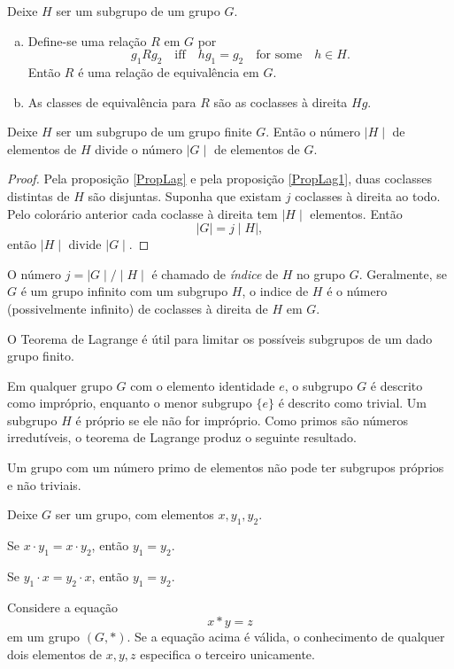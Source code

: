 \begin{stat}\label{PropLag}
  Deixe $H$ ser um subgrupo de um grupo $G$.
  \begin{enumerate}[a.]
    \item Define-se uma relação $R$ em $G$ por $$ g_{1} R g_{2}\quad \textrm{iff}\quad hg_{1} = g_{2}\quad \textrm{for\ some}\quad h\in H.$$ Então $R$ é uma relação de equivalência em $G$.
    \item As classes de equivalência para $R$ são as coclasses à direita $Hg$.
  \end{enumerate}
\end{stat}

\begin{theorem}
  Deixe $H$ ser um subgrupo de um grupo finite $G$. Então o número $\mid H\mid$ de elementos de $H$ divide o número $\mid G\mid$ de elementos de $G$.
  \begin{proof}
    Pela proposição \ref{PropLag} e pela proposição \ref{PropLag1}, duas coclasses distintas de $H$ são disjuntas. Suponha que existam $j$ coclasses à direita ao todo. Pelo colorário anterior cada coclasse à direita tem $\mid H \mid$ elementos. Então
    $$ \mid G\mid = j\mid H\mid,$$ então $\mid H \mid $ divide $\mid G \mid $.
  \end{proof}
\end{theorem}

O número $j = \mid G\mid / \mid H\mid$ é chamado de \emph{índice} de $H$ no grupo $G$. Geralmente, se $G$ é um grupo infinito com um subgrupo $H$, o indice de $H$ é o número (possivelmente infinito) de coclasses à direita de $H$ em $G$.

O Teorema de Lagrange é útil para limitar os possíveis subgrupos de um dado grupo finito.

Em qualquer grupo $G$ com o elemento identidade $e$, o subgrupo $G$ é descrito como impróprio, enquanto o menor subgrupo $\{e\}$ é descrito como trivial. Um subgrupo $H$ é próprio se ele não for impróprio. Como primos são números irredutíveis, o teorema de Lagrange produz o seguinte resultado.
\begin{stat}
  Um grupo com um número primo de elementos não pode ter subgrupos próprios e não triviais.
\end{stat}

\begin{stat}
  Deixe $G$ ser um grupo, com elementos $x,y_{1},y_{2}$.
  

  Se $x\cdot y_{1} = x\cdot y_{2}$, então $y_{1} = y_{2}$.

  Se $y_{1}\cdot x = y_{2}\cdot x$, então $y_{1} = y_{2}$.
\end{stat}
\begin{corollary}\label{UnicSolu}
  Considere a equação $$x * y = z$$
  em um grupo $(G,*)$. Se a equação acima é válida, o conhecimento de qualquer dois elementos de $x,y,z$ especifica o terceiro unicamente.
\end{corollary}

